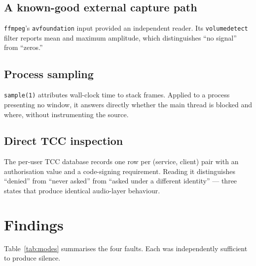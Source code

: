 \documentclass[10pt,letterpaper,twocolumn]{article}
\newcommand{\code}[1]{\texttt{#1}}
\begin{document}
\subsection{A known-good external capture path}

\code{ffmpeg}'s \code{avfoundation} input provided an independent reader. Its \code{volumedetect} filter reports mean and maximum amplitude, which distinguishes ``no signal'' from ``zeros.''

\subsection{Process sampling}

\code{sample(1)} attributes wall-clock time to stack frames. Applied to a process presenting no window, it answers directly whether the main thread is blocked and where, without instrumenting the source.

\subsection{Direct TCC inspection}

The per-user TCC database records one row per (service, client) pair with an authorisation value and a code-signing requirement. Reading it distinguishes ``denied'' from ``never asked'' from ``asked under a different identity'' --- three states that produce identical audio-layer behaviour.

\section{Findings}

Table~\ref{tab:modes} summarises the four faults. Each was independently sufficient to produce silence.
\end{document}
